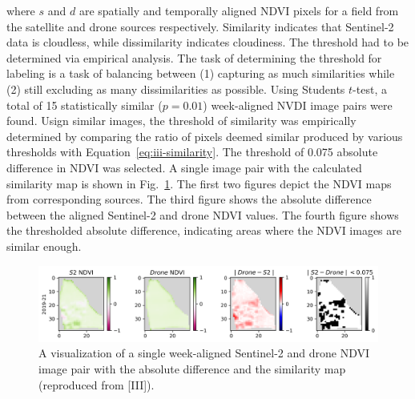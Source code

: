 \noindent where $s$ and $d$ are spatially and temporally aligned NDVI pixels for a field from the satellite and drone sources respectively. Similarity indicates that Sentinel-2 data is cloudless, while dissimilarity indicates cloudiness. The threshold had to be determined via empirical analysis. The task of determining the threshold for labeling is a task of balancing between (1) capturing as much similarities while (2) still excluding as many dissimilarities as possible. Using Students $t$-test, a total of 15 statistically similar ($p = 0.01$) week-aligned NVDI image pairs were found. Usign similar images, the threshold of similarity was empirically determined by comparing the ratio of pixels deemed similar produced by various thresholds with Equation~\ref{eq:iii-similarity}. The threshold of 0.075 absolute difference in NDVI was selected. A single image pair with the calculated similarity map is shown in Fig.~\ref{fig:iii-s2-drone-comparison}. The first two figures depict the NDVI maps from corresponding sources. The third figure shows the absolute difference between the aligned Sentinel-2 and drone NDVI values. The fourth figure shows the thresholded absolute difference, indicating areas where the NDVI images are similar enough. 

\begin{figure}[htb]
    \centering
    \includegraphics[width=\textwidth]{./Images/iii-targets-8860198450-2019-21.png}
    \caption{A visualization of a single week-aligned Sentinel-2 and drone NDVI image pair with the absolute difference and the similarity map (reproduced from [III]).}
    \label{fig:iii-s2-drone-comparison}
\end{figure}

